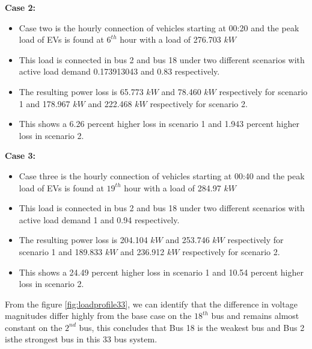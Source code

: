  		\textbf{Case 2:}
 		\begin{itemize}
 			\item Case two is the hourly  connection of vehicles starting at 00:20 and the peak load of EVs is found at $6^{th}$ hour with a load of 276.703 $kW$ 
 			\item This load is connected in bus 2 and bus 18 under two different scenarios with active load demand 0.173913043 and 0.83 respectively.
 			\item The resulting power loss is 65.773 $kW$ and 78.460 $kW$ respectively for scenario 1 and 178.967 $kW$ and 222.468 $kW$ respectively for scenario 2.
 			\item This shows a 6.26 percent higher loss in scenario 1 and 1.943 percent higher loss in scenario 2.
 		\end{itemize}
 		
 		\textbf{Case 3:}
 		\begin{itemize}
 			\item Case three is the hourly connection of vehicles starting at 00:40 and the peak load of EVs is found at $19^{th}$ hour with a load of 284.97 $kW$ 
 			\item This load is connected in bus 2 and bus 18 under two different scenarios with active load demand 1 and 0.94 respectively.
 			\item The resulting power loss is 204.104 $kW$ and 253.746 $kW$ respectively for scenario 1 and 189.833 $kW$ and 236.912 $kW$ respectively for scenario 2.
 			\item This shows a 24.49 percent higher loss in scenario 1 and 10.54 percent higher loss in scenario 2.
 		\end{itemize}
 		
 		From the figure \ref{fig:loadprofile33},  we can identify that the difference in voltage magnitudes differ highly from the base case on the $18^{th}$ bus and remains almost constant on the $2^{nd}$ bus, this concludes that Bus 18 is the weakest bus and Bus 2 isthe strongest bus in this 33 bus system. 
 		
 		
 		
 		
 		
 		
 		
 		
 		
 		
 		
 		
 		
 		
 		
